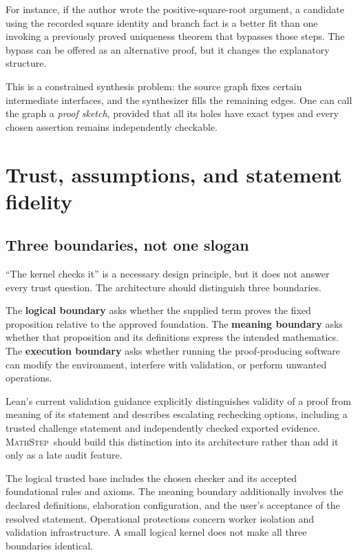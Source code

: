 \documentclass[11pt,a4paper]{article}
\theoremstyle{remark}
\newcommand{\ms}{\textsc{MathStep}}
\begin{document}
For instance, if the author wrote the positive-square-root argument, a candidate using the recorded square identity and branch fact is a better fit than one invoking a previously proved uniqueness theorem that bypasses those steps. The bypass can be offered as an alternative proof, but it changes the explanatory structure.

This is a constrained synthesis problem: the source graph fixes certain intermediate interfaces, and the synthesizer fills the remaining edges. One can call the graph a \emph{proof sketch}, provided that all its holes have exact types and every chosen assertion remains independently checkable.

\section{Trust, assumptions, and statement fidelity}\label{sec:trust}

\subsection{Three boundaries, not one slogan}
``The kernel checks it'' is a necessary design principle, but it does not answer every trust question. The architecture should distinguish three boundaries.

The \textbf{logical boundary} asks whether the supplied term proves the fixed proposition relative to the approved foundation. The \textbf{meaning boundary} asks whether that proposition and its definitions express the intended mathematics. The \textbf{execution boundary} asks whether running the proof-producing software can modify the environment, interfere with validation, or perform unwanted operations.

Lean's current validation guidance explicitly distinguishes validity of a proof from meaning of its statement and describes escalating rechecking options, including a trusted challenge statement and independently checked exported evidence.\cite{lean-validation} \ms\ should build this distinction into its architecture rather than add it only as a late audit feature.

The logical trusted base includes the chosen checker and its accepted foundational rules and axioms. The meaning boundary additionally involves the declared definitions, elaboration configuration, and the user's acceptance of the resolved statement. Operational protections concern worker isolation and validation infrastructure. A small logical kernel does not make all three boundaries identical.
\end{document}
